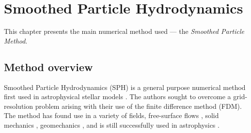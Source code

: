 \documentclass[../main.tex]{subfiles}
\begin{document}
\chapter{Smoothed Particle Hydrodynamics}
\label{chap:SPH}

This chapter presents the main numerical method used --- the \emph{Smoothed Particle Method}. 

\section{Method overview}
\label{sec:SPH_OVERVIEW}

Smoothed Particle Hydrodynamics (SPH) is a general purpose numerical method first used in astrophysical stellar models \autocite{gingoldSmoothedParticleHydrodynamics1977}. The authors sought to overcome a grid-resolution problem arising with their use of the finite difference method (FDM). The method has found use in a variety of fields, \viz free-surface flows \autocite{monaghanSimulatingFreeSurface1994a}, solid mechanics \autocite{liberskySmoothParticleHydrodynamics1991}, geomechanics \autocite{buiLagrangianMeshfreeParticles2008}, and is still successfully used in astrophysics \autocite{springelSimulationsFormationEvolution2005}. 
\end{document}
